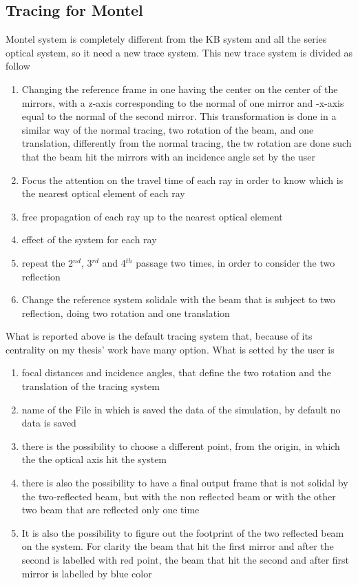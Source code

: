 \subsection{Tracing for Montel}
Montel system is completely different from the KB system and all the series optical system, so it need a new trace system. This new trace system is divided as follow
\begin{enumerate}
	\item Changing the reference frame in one having the center on the center of the mirrors, with a z-axis corresponding to the normal of one mirror and -x-axis equal to the normal of the second mirror. This transformation is done in a similar way of the normal tracing, two rotation of the beam, and one translation, differently from the normal tracing, the tw rotation are done such that the beam hit the mirrors with an incidence angle set by the user
	\item Focus the attention on the travel time of each ray in order to know which is the nearest optical element of each ray
	\item free propagation of each ray up to the nearest optical element
	\item effect of the system for each ray
	\item repeat the 2$^{nd} $, 3$^{rd} $ and 4$^{th} $ passage two times, in order to consider the two reflection
	\item Change the reference system solidale with the beam that is subject to two reflection, doing two rotation and one translation
\end{enumerate}  

\noindent What is reported above is the default tracing system that, because of its centrality on my thesis' work have many option. What is setted by the user is 
\begin{enumerate}
	\item focal distances and incidence angles, that define the two rotation and the translation of the tracing system
	\item name of the File in which is saved the data of the simulation, by default no data is saved
	\item there is the possibility to choose a different point, from the origin, in which the the optical axis hit the system
	\item there is also the possibility to have a final output frame that is not solidal by the two-reflected beam, but with the non reflected beam or with the other two beam that are reflected only one time
	\item It is also the possibility to figure out the footprint of the two reflected beam on the system. For clarity the beam that hit the first mirror and after the second is labelled with red point, the beam that hit the second and after first mirror is labelled by blue color
\end{enumerate}

